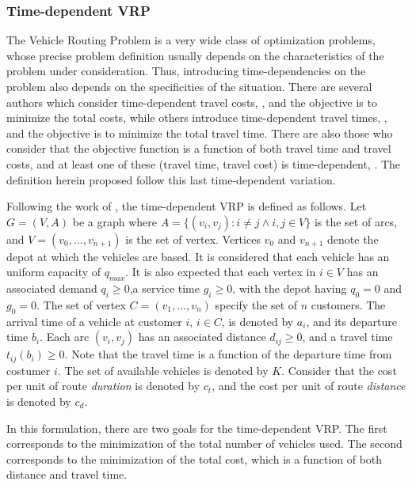 \subsubsection{Time-dependent VRP}
\label{sec:time-dependent-vrp}


The Vehicle Routing Problem is a very wide class of optimization problems, whose precise problem definition usually depends on the characteristics of the problem under consideration. Thus, introducing time-dependencies on the problem also depends on the specificities of the situation. There are several authors which consider time-dependent travel costs, \cite{tdvrp_costs}, and the objective is to minimize the total costs, while others introduce time-dependent travel times, \cite{tdvrp_1}, and the objective is to minimize the total travel time. There are also those who consider that the objective function is a function of both travel time and travel costs, and at least one of these (travel time, travel cost) is time-dependent, \cite{tdvrptw_1}.
The definition herein proposed follow this last time-dependent variation.

Following the work of \cite{tdvrptw_1}, the time-dependent VRP is defined as follows. Let $G=(V,A)$ be a graph where $A=\{(v_i, v_j): i \neq j \wedge i,j \in V\}$ is the set of arcs, and $V = (v_0, ..., v_{n+1})$ is the set of vertex. Vertices $v_{0}$ and $v_{n+1}$ denote the depot at which the vehicles are based. It is considered that each vehicle has an uniform capacity of $q_{max}$. It is also expected that each vertex in $i \in V$ has an associated demand $q_i \geq 0$,a service time $g_i \geq 0$, with the depot having $q_0 = 0$ and $g_0 = 0$. The set of vertex $ C = (v_1, ..., v_{n})$ specify the set of $n$ customers. The arrival time of a vehicle at customer $i$, $i \in C$, is denoted by $a_i$, and its departure time $b_i$. Each arc $(v_i, v_j)$ has an associated distance $d_{ij} \geq 0$, and a travel time $t_{ij}(b_i) \geq 0$. Note that the travel time is a function 
of the departure time from costumer $i$. The set of available vehicles is denoted by $K$. Consider that the cost per unit of route \textit{duration} is denoted by $c_{t}$, and the cost per unit of route \textit{distance} is denoted by $c_{d}$. 

In this formulation, there are two goals for the time-dependent VRP. The first corresponds to the minimization of the total number of vehicles used. The second corresponds to the minimization of the total cost, which is a function of both distance and travel time.

